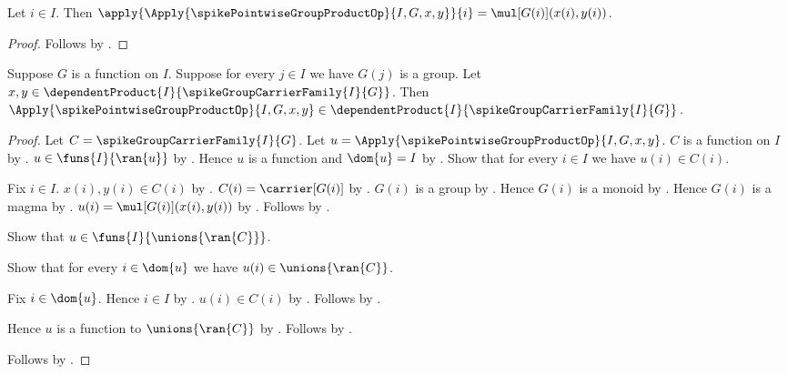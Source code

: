 \begin{proposition}\label{spike_pointwise_group_product_coordinate}
    Let $i\in I$.
    Then
        $\apply{\Apply{\spikePointwiseGroupProductOp}{I,G,x,y}}{i}
            =\mul[G(i)](x(i),y(i))$.
\end{proposition}
\begin{proof}
    Follows by
        .
\end{proof}

\begin{proposition}\label{spike_pointwise_group_product_type}
    Suppose $G$ is a function on $I$.
    Suppose for every $j\in I$ we have $G(j)$ is a group.
    Let
        $x,y\in\dependentProduct
            {I}{\spikeGroupCarrierFamily{I}{G}}$.
    Then
        $\Apply{\spikePointwiseGroupProductOp}{I,G,x,y}\in
            \dependentProduct{I}{\spikeGroupCarrierFamily{I}{G}}$.
\end{proposition}
\begin{proof}
    Let $C=\spikeGroupCarrierFamily{I}{G}$.
    Let $u=\Apply{\spikePointwiseGroupProductOp}{I,G,x,y}$.
    $C$ is a function on $I$ by
        .
    $u\in\funs{I}{\ran{u}}$ by
        .
    Hence $u$ is a function and $\dom{u}=I$ by
        .
    Show that for every $i\in I$ we have $u(i)\in C(i)$.
    \begin{subproof}
        Fix $i\in I$.
        $x(i),y(i)\in C(i)$ by
            .
        $C(i)=\carrier[G(i)]$ by
            .
        $G(i)$ is a group by \auto.
        Hence $G(i)$ is a monoid by .
        Hence $G(i)$ is a magma by .
        $u(i)=\mul[G(i)](x(i),y(i))$ by
            .
        Follows by .
    \end{subproof}
    Show that $u\in\funs{I}{\unions{\ran{C}}}$.
    \begin{subproof}
        Show that for every $i\in\dom{u}$ we have
            $u(i)\in\unions{\ran{C}}$.
        \begin{subproof}
            Fix $i\in\dom{u}$.
            Hence $i\in I$ by \auto.
            $u(i)\in C(i)$ by \auto.
            Follows by .
        \end{subproof}
        Hence $u$ is a function to $\unions{\ran{C}}$ by
            \auto.
        Follows by .
    \end{subproof}
    Follows by .
\end{proof}

